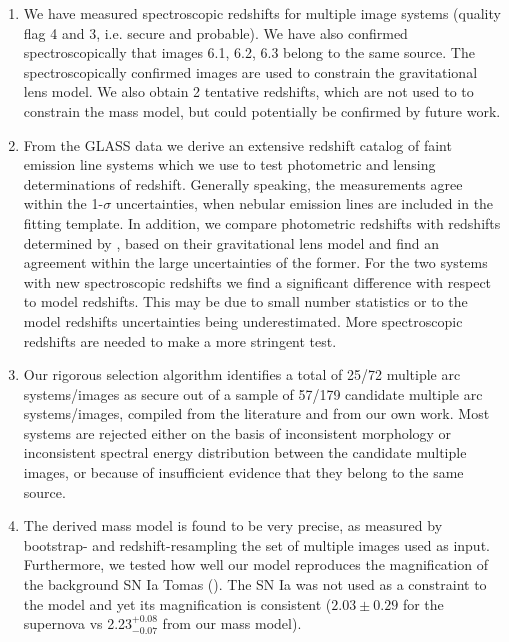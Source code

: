 \begin{enumerate}

\item  We have measured spectroscopic redshifts for \NimgELhiQ{} multiple image systems (quality flag 4 and 3, i.e. secure and 
  probable). We have also confirmed spectroscopically that images 6.1, 6.2, 6.3 belong to the same source. The spectroscopically confirmed images are used to constrain the gravitational lens model. We also obtain 2 tentative redshifts, which are not used to 
  to constrain the mass model, but could potentially be confirmed by future work.

\item From the GLASS data we derive an extensive
redshift catalog of faint emission line systems which we use to test
photometric and lensing determinations of redshift. Generally
speaking, the measurements agree within the 1-$\sigma$ uncertainties,
when nebular emission lines are included in the fitting template.  In
addition, we compare photometric redshifts with redshifts determined
by \citet{2014arXiv1409.8663J}, based on their gravitational lens model and
find an agreement within the large uncertainties of the former. For
the two systems with new spectroscopic redshifts we find a significant
difference with respect to model redshifts. This may be due to small
number statistics or to the model redshifts uncertainties being
underestimated. More spectroscopic redshifts are needed to make a more
stringent test.

\item Our rigorous selection algorithm identifies a total of 25/72 multiple arc systems/images as secure out of a sample of 57/179 
  candidate multiple arc systems/images, compiled from the literature
  and from our own work. Most systems are rejected either on the basis
  of inconsistent morphology or inconsistent spectral energy
  distribution between the candidate multiple images, or because of
  insufficient evidence that they belong to the same source.

\item The derived mass model is found to be very precise, as measured by bootstrap- and redshift-resampling the set of multiple images used as 
  input. Furthermore, we tested how well our model reproduces the magnification of the background SN Ia Tomas (\citealp{Rod++15}). The SN Ia was not used as a constraint to the model and yet its magnification is consistent 
  ($2.03 \pm0.29$ for the supernova vs 2.23$^{+0.08}_{-0.07}$ from our mass model). 


\end{enumerate}
